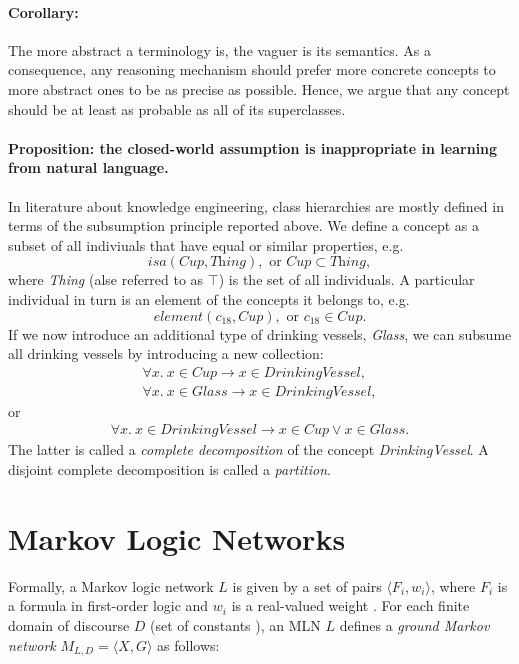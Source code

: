 \documentclass[12pt,a4paper]{article}
\newcommand{\impl}{\rightarrow}
\begin{document}
\paragraph{Corollary:} The more abstract a terminology is, the 
vaguer is its semantics. As a consequence, any reasoning mechanism 
should prefer more concrete concepts to more abstract ones to be as 
precise as possible. Hence, we argue that any concept should be at least
as probable as all of its superclasses.

\newcommand{\Cup}{\textit{Cup}}
\newcommand{\Thing}{\textit{Thing}}
\newcommand{\Glass}{\textit{Glass}}
\newcommand{\DrinkingVessel}{\textit{DrinkingVessel}}
\paragraph{Proposition: the closed-world assumption is inappropriate 
in learning from natural language.} In literature about knowledge 
engineering, class hierarchies are mostly defined in terms of the 
subsumption principle reported above. We define a concept as a subset
of all indiviuals that have equal or similar properties, e.g.
$$
	\textit{isa}(\Cup, \Thing), \text{ or }\Cup\subset \Thing,
$$
where \textit{Thing} (alse referred to as $\top$) is the set of all individuals.
A particular individual in turn is an element of the concepts it belongs to, e.g.\ 
$$
	\textit{element}(c_{18}, \Cup), \text{ or } c_{18}\in \Cup.
$$
If we now introduce an additional type of drinking vessels, \Glass,
we can subsume all drinking vessels by introducing a new collection:
\begin{eqnarray}	
	\forall x.\ x\in \Cup\impl x\in\DrinkingVessel,\nonumber\\
	\forall x.\ x\in \Glass\impl x\in\DrinkingVessel,\nonumber
\end{eqnarray}
or
\begin{eqnarray}	
	\forall x.\ x\in \DrinkingVessel\impl x\in\Cup\lor x\in\Glass.\nonumber
\end{eqnarray}
The latter is called a \emph{complete decomposition} of the concept \DrinkingVessel.
A disjoint complete decomposition is called a \emph{partition}.

\section{Markov Logic Networks}

Formally, a Markov logic network $L$ is given by a set of pairs $\langle F_i, w_i \rangle$, where $F_i$ is a formula in first-order
logic and $w_i$ is a real-valued weight \cite{richardson06ml}. For each finite domain of discourse $D$ (set of constants%
), 
an MLN $L$ defines a \emph{ground Markov network} $M_{L,D} = \langle X, G \rangle$ 
as follows:
\end{document}
